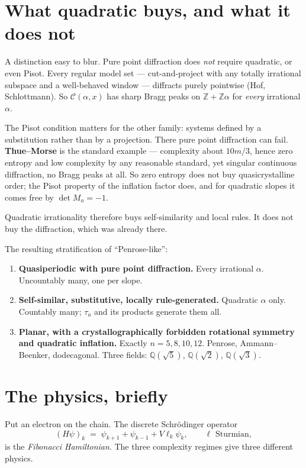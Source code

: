 \documentclass[11pt,a4paper]{article}
\newcommand{\C}{\mathcal{C}}
\newcommand{\Q}{\mathbb{Q}}
\newcommand{\Z}{\mathbb{Z}}
\theoremstyle{definition}
\theoremstyle{plain}
\begin{document}
\section{What quadratic buys, and what it does not}

A distinction easy to blur. Pure point diffraction does \emph{not} require
quadratic, or even Pisot. Every regular model set --- cut-and-project with any
totally irrational subspace and a well-behaved window --- diffracts purely
pointwise (Hof, Schlottmann). So $\C(\alpha,x)$ has sharp Bragg peaks on
$\Z + \Z\alpha$ for \emph{every} irrational $\alpha$.

The Pisot condition matters for the other family: systems defined by a
substitution rather than by a projection. There pure point diffraction can fail.
\textbf{Thue--Morse} is the standard example --- complexity about $10m/3$, hence
zero entropy and low complexity by any reasonable standard, yet singular
continuous diffraction, no Bragg peaks at all. So zero entropy does not buy
quasicrystalline order; the Pisot property of the inflation factor does, and for
quadratic slopes it comes free by $\det M_a = -1$.

Quadratic irrationality therefore buys self-similarity and local rules. It does
not buy the diffraction, which was already there.

The resulting stratification of ``Penrose-like'':
\begin{enumerate}
\item \textbf{Quasiperiodic with pure point diffraction.} Every irrational
  $\alpha$. Uncountably many, one per slope.
\item \textbf{Self-similar, substitutive, locally rule-generated.} Quadratic
  $\alpha$ only. Countably many; $\tau_a$ and its products generate them all.
\item \textbf{Planar, with a crystallographically forbidden rotational symmetry
  and quadratic inflation.} Exactly $n = 5, 8, 10, 12$. Penrose,
  Ammann--Beenker, dodecagonal. Three fields: $\Q(\sqrt 5)$, $\Q(\sqrt 2)$,
  $\Q(\sqrt 3)$.
\end{enumerate}

\section{The physics, briefly}

Put an electron on the chain. The discrete Schr\"odinger operator
\[
  (H\psi)_k \;=\; \psi_{k+1} + \psi_{k-1} + V \ell_k \psi_k ,
  \qquad \ell \text{ Sturmian},
\]
is the \emph{Fibonacci Hamiltonian}. The three complexity regimes give three
different physics.
\end{document}
